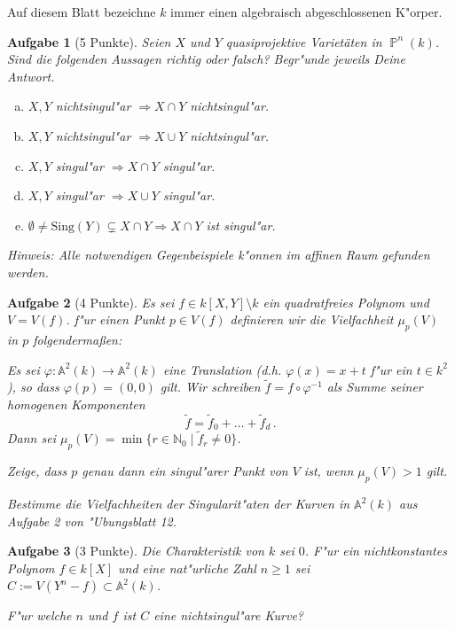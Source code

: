 \documentclass[a4paper, 12pt, numbers=noendperiod, chapterprefix=true]{scrbook}
\theoremstyle{break}
\newtheorem{Aufg}{Aufgabe}
\theoremstyle{nonumberbreak}
\theoremstyle{nonumberplain}
\newcommand{\set}[2]{\{#1\mid #2\}} %
\newcommand{\N}{\mathbb{N}}
\newcommand{\A}{\mathbb{A}}
\newcommand{\Affine}{\mathbb{A}} %
\DeclareMathOperator{\Projective}{\mathbb{P}} %
\begin{document}
Auf diesem Blatt bezeichne $k$ immer einen algebraisch abgeschlossenen K"orper.

\begin{Aufg}[5 Punkte]
Seien $X$ und $Y$ quasiprojektive Variet\"aten in $\Projective^n(k)$. Sind die folgenden Aussagen richtig oder falsch? Begr"unde jeweils Deine Antwort.
\begin{enumerate}[a)]
	\item $X,Y$ nichtsingul"ar $\Rightarrow X \cap Y$ nichtsingul"ar.
	\item $X,Y$ nichtsingul"ar $\Rightarrow X \cup Y$ nichtsingul"ar.
	\item $X,Y$ singul"ar $\Rightarrow X \cap Y$ singul"ar.
	\item $X,Y$ singul"ar $\Rightarrow X \cup Y$ singul"ar.
	\item $\emptyset \neq \textrm{Sing}(Y) \subsetneq X \cap Y \Rightarrow X \cap Y$ ist singul"ar.
\end{enumerate}
\emph{Hinweis:} Alle notwendigen Gegenbeispiele k"onnen im affinen Raum gefunden werden.
\end{Aufg}

\begin{Aufg}[4 Punkte]
Es sei $f\in k[X,Y] \setminus k$ ein quadratfreies Polynom und $V = V(f)$. f"ur einen Punkt $p \in V(f)$ definieren wir die Vielfachheit $\mu_p(V)$ in $p$ folgenderma\ss en: 

Es sei $\varphi \colon \Affine^2(k)\to \Affine^2(k)$ eine Translation (d.h. $\varphi(x) = x + t$ f"ur ein $t\in k^2$), so dass $\varphi(p) = (0,0)$ gilt. Wir schreiben $\tilde f = f\circ \varphi^{-1}$ als Summe seiner homogenen Komponenten
	\[\tilde f = \tilde f_0 +\dots + \tilde f_d\,.\]
Dann sei $\mu_p(V) = \min\set{r\in \N_0}{\tilde f_r \neq 0}$.

Zeige, dass $p$ genau dann ein singul"arer Punkt von $V$ ist, wenn $\mu_p(V) > 1$ gilt.

Bestimme die Vielfachheiten der Singularit"aten der Kurven in $\Affine^2(k)$ aus Aufgabe 2 von "Ubungsblatt 12.
\end{Aufg}

\begin{Aufg}[3 Punkte]
Die Charakteristik von $k$ sei $0$. F"ur ein nichtkonstantes Polynom $f\in k[X]$ und eine nat"urliche Zahl $n\geq 1$ sei $C := V(Y^n - f)\subset \Affine^2(k)$. 

F"ur welche $n$ und $f$ ist $C$ eine nichtsingul"are Kurve?
\end{Aufg}
\end{document}
